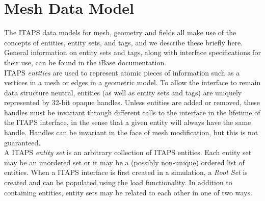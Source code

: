 \documentclass{article}
\begin{document}
\section{Mesh Data Model}

The ITAPS data models for mesh, geometry and fields all make use 
of the concepts of entities, entity sets, and tags, and we describe 
these briefly here. General information on entity sets and tags, 
along with interface specifications for their use, can be found 
in the iBase documentation.\\


ITAPS \emph{entities} are used to represent atomic pieces of information 
such as a vertices in a mesh or edges in a geometric model. To 
allow the interface to remain data structure neutral, entities 
(as well as entity sets and tags) are uniquely represented by 
32-bit opaque handles. Unless entities are added or removed, 
these handles must be invariant through different calls to the 
interface in the lifetime of the ITAPS interface, in the sense 
that a given entity will always have the same handle. Handles 
can be invariant in the face of mesh modification, but this is 
not guaranteed. \\


A ITAPS \emph{entity set} is an arbitrary collection of ITAPS entities. 
Each entity set may be an unordered set or it may be a (possibly 
non-unique) ordered list of entities. When a ITAPS interface is 
first created in a simulation, a \emph{Root Set} is created and 
can be populated using the load functionality. In addition to 
containing entities, entity sets may be related to each other 
in one of two ways.
\end{document}
